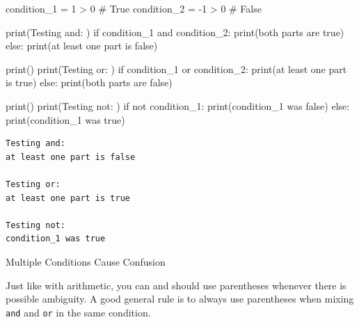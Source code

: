 \documentclass[
  letterpaper,
  DIV=11,
  numbers=noendperiod]{scrreprt}
\newenvironment{Shaded}{\begin{snugshade}}{\end{snugshade}}
\newcommand{\BuiltInTok}[1]{\textcolor[rgb]{0.00,0.23,0.31}{#1}}
\newcommand{\CommentTok}[1]{\textcolor[rgb]{0.37,0.37,0.37}{#1}}
\newcommand{\ControlFlowTok}[1]{\textcolor[rgb]{0.00,0.23,0.31}{#1}}
\newcommand{\DecValTok}[1]{\textcolor[rgb]{0.68,0.00,0.00}{#1}}
\newcommand{\KeywordTok}[1]{\textcolor[rgb]{0.00,0.23,0.31}{#1}}
\newcommand{\NormalTok}[1]{\textcolor[rgb]{0.00,0.23,0.31}{#1}}
\newcommand{\OperatorTok}[1]{\textcolor[rgb]{0.37,0.37,0.37}{#1}}
\newcommand{\StringTok}[1]{\textcolor[rgb]{0.13,0.47,0.30}{#1}}
\begin{document}
\begin{Shaded}
\begin{Highlighting}[]
\NormalTok{condition\_1 }\OperatorTok{=}  \DecValTok{1} \OperatorTok{\textgreater{}} \DecValTok{0}  \CommentTok{\# True}
\NormalTok{condition\_2 }\OperatorTok{=} \OperatorTok{{-}}\DecValTok{1} \OperatorTok{\textgreater{}} \DecValTok{0}  \CommentTok{\# False}

\BuiltInTok{print}\NormalTok{(}\StringTok{\textquotesingle{}Testing and: \textquotesingle{}}\NormalTok{)}
\ControlFlowTok{if}\NormalTok{ condition\_1 }\KeywordTok{and}\NormalTok{ condition\_2:}
    \BuiltInTok{print}\NormalTok{(}\StringTok{\textquotesingle{}both parts are true\textquotesingle{}}\NormalTok{)}
\ControlFlowTok{else}\NormalTok{:}
    \BuiltInTok{print}\NormalTok{(}\StringTok{\textquotesingle{}at least one part is false\textquotesingle{}}\NormalTok{)}

\BuiltInTok{print}\NormalTok{()}
\BuiltInTok{print}\NormalTok{(}\StringTok{\textquotesingle{}Testing or: \textquotesingle{}}\NormalTok{)}
\ControlFlowTok{if}\NormalTok{ condition\_1 }\KeywordTok{or}\NormalTok{ condition\_2:}
    \BuiltInTok{print}\NormalTok{(}\StringTok{\textquotesingle{}at least one part is true\textquotesingle{}}\NormalTok{)}
\ControlFlowTok{else}\NormalTok{:}
    \BuiltInTok{print}\NormalTok{(}\StringTok{\textquotesingle{}both parts are false\textquotesingle{}}\NormalTok{)}

\BuiltInTok{print}\NormalTok{()}
\BuiltInTok{print}\NormalTok{(}\StringTok{\textquotesingle{}Testing not: \textquotesingle{}}\NormalTok{)}
\ControlFlowTok{if} \KeywordTok{not}\NormalTok{ condition\_1:}
    \BuiltInTok{print}\NormalTok{(}\StringTok{\textquotesingle{}condition\_1 was false\textquotesingle{}}\NormalTok{)}
\ControlFlowTok{else}\NormalTok{:}
    \BuiltInTok{print}\NormalTok{(}\StringTok{\textquotesingle{}condition\_1 was true\textquotesingle{}}\NormalTok{)}
\end{Highlighting}
\end{Shaded}

\begin{verbatim}
Testing and: 
at least one part is false

Testing or: 
at least one part is true

Testing not: 
condition_1 was true
\end{verbatim}

\begin{tcolorbox}[enhanced jigsaw, rightrule=.15mm, opacitybacktitle=0.6, colback=white, toprule=.15mm, colframe=quarto-callout-tip-color-frame, bottomtitle=1mm, bottomrule=.15mm, arc=.35mm, coltitle=black, breakable, title=\textcolor{quarto-callout-tip-color}{\faLightbulb}\hspace{0.5em}{Tip}, titlerule=0mm, opacityback=0, colbacktitle=quarto-callout-tip-color!10!white, left=2mm, toptitle=1mm, leftrule=.75mm]
Multiple Conditions Cause Confusion

Just like with arithmetic, you can and should use parentheses whenever
there is possible ambiguity. A good general rule is to always use
parentheses when mixing \texttt{and} and \texttt{or} in the same
condition.
\end{tcolorbox}
\end{document}
